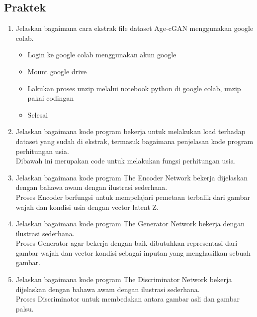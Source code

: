 \subsection{Praktek}
\begin{enumerate}

\item Jelaskan bagaimana cara ekstrak ﬁle dataset Age-cGAN menggunakan google colab.
	\hfill\\
	\begin{itemize}
		\item Login ke google colab menggunakan akun google
		\item Mount google drive
		\item Lakukan proses unzip melalui notebook python di google colab, unzip pakai codingan
		\item Selesai
	\end{itemize}
		

	\item Jelaskan bagaimana kode program bekerja untuk melakukan load terhadap dataset yang sudah di ekstrak, termasuk bagaimana penjelasan kode program perhitungan usia.
	\hfill\\
	Dibawah ini merupakan code untuk melakukan fungsi perhitungan usia.
		

	\item Jelaskan bagaimana kode program The Encoder Network bekerja dijelaskan dengan bahawa awam dengan ilustrasi sederhana.
	\hfill\\
	Proses Encoder berfungsi untuk mempelajari pemetaan terbalik dari gambar wajah dan kondisi usia dengan vector latent Z.
		

	\item Jelaskan bagaimana kode program The Generator Network bekerja  dengan ilustrasi sederhana.
	\hfill\\
	Proses Generator agar bekerja dengan baik dibutuhkan representasi dari gambar wajah dan vector kondisi sebagai inputan yang menghasilkan sebuah gambar.
		

	\item Jelaskan bagaimana kode program The Discriminator Network bekerja dijelaskan dengan bahawa awam dengan ilustrasi sederhana.
	\hfill\\
	Proses Discriminator untuk membedakan antara gambar asli dan gambar palsu.
		


\end{enumerate}
